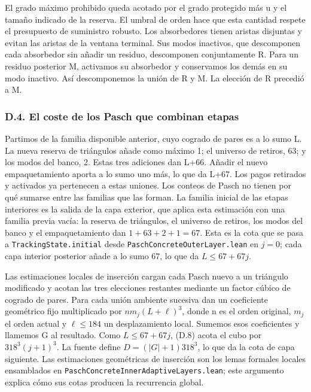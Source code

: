 \documentclass[spanish,11pt,a4paper]{article}
\begin{document}
El grado máximo prohibido queda acotado por el grado protegido más u y el tamaño indicado de la reserva. El umbral de orden hace que esta cantidad respete el presupuesto de suministro robusto. Los absorbedores tienen aristas disjuntas y evitan las aristas de la ventana terminal. Sus modos inactivos, que descomponen cada absorbedor sin añadir un residuo, descomponen conjuntamente R. Para un residuo posterior M, activamos su absorbedor y conservamos los demás en su modo inactivo. Así descomponemos la unión de R y M. La elección de R precedió a M.

\subsubsection{D.4. El coste de los Pasch que combinan etapas}\label{d.4.-el-coste-de-los-pasch-que-combinan-etapas}

Partimos de la familia disponible anterior, cuyo cogrado de pares es a lo sumo L. La nueva reserva de triángulos añade como máximo 1; el universo de retiros, 63; y los modos del banco, 2. Estas tres adiciones dan L+66. Añadir el nuevo empaquetamiento aporta a lo sumo uno más, lo que da L+67. Los pagos retirados y activados ya pertenecen a estas uniones. Los conteos de Pasch no tienen por qué sumarse entre las familias que las forman. La familia inicial de las etapas interiores es la salida de la capa exterior, que aplica esta estimación con una familia previa vacía: la reserva de triángulos, el universo de retiros, los modos del banco y el empaquetamiento dan \(1+63+2+1=67\). Esta es la cota que se pasa a \texttt{Tracking\allowbreak{}State.\allowbreak{}initial} desde \texttt{Pasch\allowbreak{}Concrete\allowbreak{}Outer\allowbreak{}Layer.\allowbreak{}lean} en \(j=0\); cada capa interior posterior añade a lo sumo 67, lo que da \(L\leq67+67j\).

Las estimaciones locales de inserción cargan cada Pasch nuevo a un triángulo modificado y acotan las tres elecciones restantes mediante un factor cúbico de cogrado de pares. Para cada unión ambiente sucesiva dan un coeficiente geométrico fijo multiplicado por \(nm_j(L+\ell)^3\), donde n es el orden original, \(m_j\) el orden actual y \(\ell\leq184\) un desplazamiento local. Sumemos esos coeficientes y llamemos G al resultado. Como \(L\leq67+67j\), (D.8) acota el cubo por \(318^3(j+1)^3\). La fuente define \(D=(|G|+1)318^3\), lo que da la cota de capa siguiente. Las estimaciones geométricas de inserción son los lemas formales locales ensamblados en \texttt{Pasch\allowbreak{}Concrete\allowbreak{}Inner\allowbreak{}Adaptive\allowbreak{}Layers.\allowbreak{}lean}; este argumento explica cómo sus cotas producen la recurrencia global.
\end{document}
